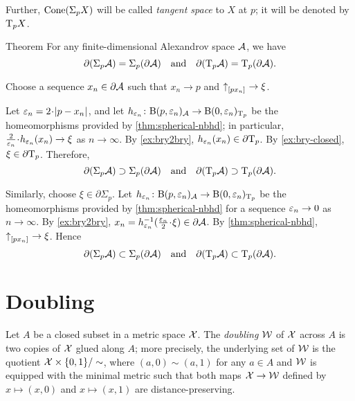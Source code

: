 Further, $\mathop{\rm Cone}\nolimits(\Sigma_pX)$ will be called \emph{tangent space} to $X$ at $p$;
it will be denoted by $\mathrm{T}_pX$.

\begin{thm}{Theorem}\label{thm:partial-Sigma}
For any finite-dimensional Alexandrov space $\mathcal{A}$, we have
\[\partial (\Sigma_p\mathcal{A})=\Sigma_p(\partial\mathcal{A})
\quad\text{and}\quad
\partial(\mathrm{T}_p\mathcal{A})=\mathrm{T}_p(\partial\mathcal{A}).\]
\end{thm}

Choose a sequence $x_n\in \partial \mathcal{A}$ such that $x_n\to p$ and ${\uparrow}_{[{p}{x_n}]_{{}}}\to\xi$.

Let $\eps_n=2\cdot \dist{p}{x_n}{}$,
and let $h_{\varepsilon_n}\colon\mathrm{B}{}(p,\varepsilon_n)_{\mathcal{A}}\to \mathrm{B}{}(0,\varepsilon_n)_{\mathrm{T}_p}$ be the homeomorphisms provided by \ref{thm:spherical-nbhd};
in particular, $\tfrac2{\eps_n}\cdot h_{\eps_n}(x_n)\to \xi$ as $n\to\infty$.
By \ref{ex:bry2bry}, $h_{\varepsilon_n}(x_n)\in \partial \mathrm{T}_p$.
By \ref{ex:bry-closed}, $\xi\in \partial \mathrm{T}_p$.
Therefore,
\[\partial (\Sigma_p\mathcal{A})\supset\Sigma_p(\partial\mathcal{A})
\quad\text{and}\quad
\partial(\mathrm{T}_p\mathcal{A})\supset\mathrm{T}_p(\partial\mathcal{A}).\]

Similarly, choose $\xi\in\partial\Sigma_p$.
Let $h_{\varepsilon_n}\colon\mathrm{B}{}(p,\varepsilon_n)_{\mathcal{A}}\to \mathrm{B}{}(0,\varepsilon_n)_{\mathrm{T}_p}$ be the homeomorphisms provided by \ref{thm:spherical-nbhd} for a sequence $\varepsilon_n\to 0$ as $n\to\infty$.
By \ref{ex:bry2bry}, $x_n=h_{\eps_n}^{-1}(\tfrac{\eps_n}2\cdot\xi)\in \partial \spc{A}$.
By \ref{thm:spherical-nbhd}, ${\uparrow}_{[{p}{x_n}]_{{}}}\to \xi$.
Hence
\[\partial (\Sigma_p\mathcal{A})\subset\Sigma_p(\partial\mathcal{A})
\quad\text{and}\quad\partial(\mathrm{T}_p\mathcal{A})\subset\mathrm{T}_p(\partial\mathcal{A}).\]
\qedsf

\section{Doubling}

Let $A$ be a closed subset in a metric space $\mathcal{X}$.
The \emph{doubling} $\mathcal{W}$ of $\mathcal{X}$ across $A$ is two copies of $\mathcal{X}$ glued along $A$;
more precisely, the underlying set of $\mathcal{W}$ is the quotient $\mathcal{X}\times\{0,1\}/\sim$, where $(a,0)\sim (a,1)$ for any $a\in A$ and $\mathcal{W}$ is equipped with the minimal metric such that both maps $\mathcal{X}\to \mathcal{W}$ defined by $x\mapsto (x,0)$ and $x\mapsto (x,1)$ are distance-preserving.

